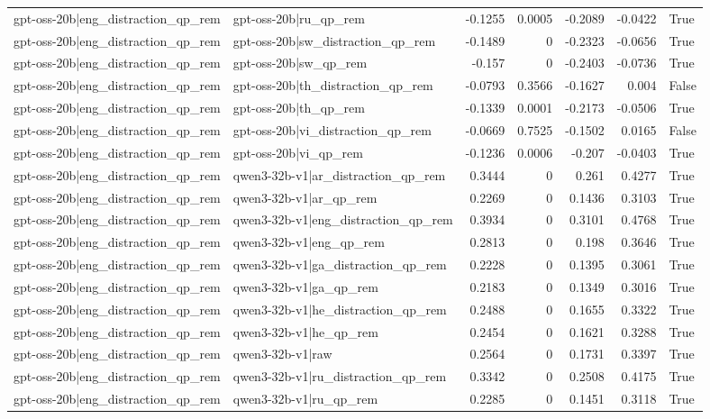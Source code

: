\begin{table}
\begin{tabular}{l l r r r r l}
gpt-oss-20b|eng_distraction_qp_rem & gpt-oss-20b|ru_qp_rem & -0.1255 & 0.0005 & -0.2089 & -0.0422 & True \\
gpt-oss-20b|eng_distraction_qp_rem & gpt-oss-20b|sw_distraction_qp_rem & -0.1489 & 0 & -0.2323 & -0.0656 & True \\
gpt-oss-20b|eng_distraction_qp_rem & gpt-oss-20b|sw_qp_rem & -0.157 & 0 & -0.2403 & -0.0736 & True \\
gpt-oss-20b|eng_distraction_qp_rem & gpt-oss-20b|th_distraction_qp_rem & -0.0793 & 0.3566 & -0.1627 & 0.004 & False \\
gpt-oss-20b|eng_distraction_qp_rem & gpt-oss-20b|th_qp_rem & -0.1339 & 0.0001 & -0.2173 & -0.0506 & True \\
gpt-oss-20b|eng_distraction_qp_rem & gpt-oss-20b|vi_distraction_qp_rem & -0.0669 & 0.7525 & -0.1502 & 0.0165 & False \\
gpt-oss-20b|eng_distraction_qp_rem & gpt-oss-20b|vi_qp_rem & -0.1236 & 0.0006 & -0.207 & -0.0403 & True \\
gpt-oss-20b|eng_distraction_qp_rem & qwen3-32b-v1|ar_distraction_qp_rem & 0.3444 & 0 & 0.261 & 0.4277 & True \\
gpt-oss-20b|eng_distraction_qp_rem & qwen3-32b-v1|ar_qp_rem & 0.2269 & 0 & 0.1436 & 0.3103 & True \\
gpt-oss-20b|eng_distraction_qp_rem & qwen3-32b-v1|eng_distraction_qp_rem & 0.3934 & 0 & 0.3101 & 0.4768 & True \\
gpt-oss-20b|eng_distraction_qp_rem & qwen3-32b-v1|eng_qp_rem & 0.2813 & 0 & 0.198 & 0.3646 & True \\
gpt-oss-20b|eng_distraction_qp_rem & qwen3-32b-v1|ga_distraction_qp_rem & 0.2228 & 0 & 0.1395 & 0.3061 & True \\
gpt-oss-20b|eng_distraction_qp_rem & qwen3-32b-v1|ga_qp_rem & 0.2183 & 0 & 0.1349 & 0.3016 & True \\
gpt-oss-20b|eng_distraction_qp_rem & qwen3-32b-v1|he_distraction_qp_rem & 0.2488 & 0 & 0.1655 & 0.3322 & True \\
gpt-oss-20b|eng_distraction_qp_rem & qwen3-32b-v1|he_qp_rem & 0.2454 & 0 & 0.1621 & 0.3288 & True \\
gpt-oss-20b|eng_distraction_qp_rem & qwen3-32b-v1|raw & 0.2564 & 0 & 0.1731 & 0.3397 & True \\
gpt-oss-20b|eng_distraction_qp_rem & qwen3-32b-v1|ru_distraction_qp_rem & 0.3342 & 0 & 0.2508 & 0.4175 & True \\
gpt-oss-20b|eng_distraction_qp_rem & qwen3-32b-v1|ru_qp_rem & 0.2285 & 0 & 0.1451 & 0.3118 & True \\

\end{tabular}
\end{table}
